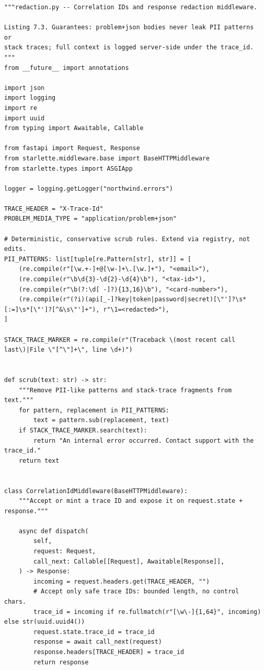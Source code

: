 \begin{verbatim}
"""redaction.py -- Correlation IDs and response redaction middleware.

Listing 7.3. Guarantees: problem+json bodies never leak PII patterns or
stack traces; full context is logged server-side under the trace_id.
"""
from __future__ import annotations

import json
import logging
import re
import uuid
from typing import Awaitable, Callable

from fastapi import Request, Response
from starlette.middleware.base import BaseHTTPMiddleware
from starlette.types import ASGIApp

logger = logging.getLogger("northwind.errors")

TRACE_HEADER = "X-Trace-Id"
PROBLEM_MEDIA_TYPE = "application/problem+json"

# Deterministic, conservative scrub rules. Extend via registry, not edits.
PII_PATTERNS: list[tuple[re.Pattern[str], str]] = [
    (re.compile(r"[\w.+-]+@[\w-]+\.[\w.]+"), "<email>"),
    (re.compile(r"\b\d{3}-\d{2}-\d{4}\b"), "<tax-id>"),
    (re.compile(r"\b(?:\d[ -]?){13,16}\b"), "<card-number>"),
    (re.compile(r"(?i)(api[_-]?key|token|password|secret)[\"']?\s*[:=]\s*[\"']?[^&\s\"']+"), r"\1=<redacted>"),
]

STACK_TRACE_MARKER = re.compile(r"(Traceback \(most recent call last\)|File \"[^\"]+\", line \d+)")


def scrub(text: str) -> str:
    """Remove PII-like patterns and stack-trace fragments from text."""
    for pattern, replacement in PII_PATTERNS:
        text = pattern.sub(replacement, text)
    if STACK_TRACE_MARKER.search(text):
        return "An internal error occurred. Contact support with the trace_id."
    return text


class CorrelationIdMiddleware(BaseHTTPMiddleware):
    """Accept or mint a trace ID and expose it on request.state + response."""

    async def dispatch(
        self,
        request: Request,
        call_next: Callable[[Request], Awaitable[Response]],
    ) -> Response:
        incoming = request.headers.get(TRACE_HEADER, "")
        # Accept only safe trace IDs: bounded length, no control chars.
        trace_id = incoming if re.fullmatch(r"[\w\-]{1,64}", incoming) else str(uuid.uuid4())
        request.state.trace_id = trace_id
        response = await call_next(request)
        response.headers[TRACE_HEADER] = trace_id
        return response



\end{verbatim}
